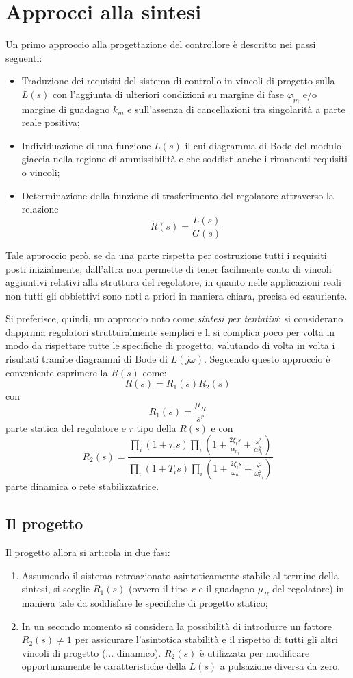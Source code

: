 \documentclass[a4paper]{report}
\begin{document}
\chapter{Approcci alla sintesi}
Un primo approccio alla progettazione del controllore \`e descritto
nei passi seguenti:
\begin{itemize}
\item Traduzione dei requisiti del sistema di controllo in vincoli di
  progetto sulla $L(s)$ con l'aggiunta di ulteriori condizioni su
  margine di fase $\varphi_m$ e/o margine di guadagno $k_m$ e
  sull'assenza di cancellazioni tra singolarit\`a a parte reale
  positiva;
\item Individuazione di una funzione $L(s)$ il cui diagramma di Bode
  del modulo giaccia nella regione di ammissibilit\`a e che soddisfi
  anche i rimanenti requisiti o vincoli;
\item Determinazione della funzione di trasferimento del regolatore
  attraverso la relazione
  \[
  R(s) = \dfrac{L(s)}{G(s)}
  \]
\end{itemize}
Tale approccio per\`o, se da una parte rispetta per costruzione tutti
i requisiti posti inizialmente, dall'altra non permette di tener
facilmente conto di vincoli aggiuntivi relativi alla struttura del
regolatore, in quanto nelle applicazioni reali non tutti gli
obbiettivi sono noti a priori in maniera chiara, precisa ed
esauriente.

Si preferisce, quindi, un approccio noto come {\em sintesi per
  tentativi}: si considerano dapprima
regolatori strutturalmente semplici e li si complica poco per volta in
modo da rispettare tutte le specifiche di progetto, valutando di volta
in volta i risultati tramite diagrammi di Bode di $L(j
\omega)$. Seguendo questo approccio \`e conveniente esprimere la
$R(s)$ come:
\[
R(s) = R_1(s) R_2(s)
\]
con
\[
R_1(s) = \dfrac{\mu_R}{s^r}
\]
parte statica del regolatore e $r$ tipo della $R(s)$ e con
\[
R_2(s) = \dfrac{\prod_i (1 + \tau_i s) \prod_i (1 + \frac{2\xi_i
    s}{\alpha_{n_i}} + \frac{s^2}{\alpha^2_{n_i}})}{\prod_i (1 + T_i s) \prod_i (1 + \frac{2\zeta_i
    s}{\omega_{n_i}} + \frac{s^2}{\omega^2_{n_i}})}
\]
parte dinamica o rete stabilizzatrice.
\section{Il progetto}
Il progetto allora si articola in due fasi:
\begin{enumerate}
\item Assumendo il sistema retroazionato asintoticamente stabile al
  termine della sintesi, si sceglie $R_1(s)$ (ovvero il tipo $r$ e il
  guadagno $\mu_R$ del regolatore) in maniera tale da soddisfare le
  specifiche di progetto statico;
\item In un secondo momento si considera la possibilit\`a di
  introdurre un fattore $R_2(s) \neq 1$ per assicurare l'asintotica
  stabilit\`a e il rispetto di tutti gli altri vincoli di progetto
  (... dinamico). $R_2(s)$ \`e utilizzata per modificare
  opportunamente le caratteristiche della $L(s)$ a pulsazione diversa
  da zero.
\end{enumerate}
\end{document}
